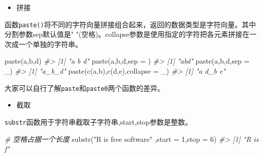 \documentclass[
]{book}
\newenvironment{Shaded}{\begin{snugshade}}{\end{snugshade}}
\newcommand{\AttributeTok}[1]{\textcolor[rgb]{0.77,0.63,0.00}{#1}}
\newcommand{\CommentTok}[1]{\textcolor[rgb]{0.56,0.35,0.01}{\textit{#1}}}
\newcommand{\DecValTok}[1]{\textcolor[rgb]{0.00,0.00,0.81}{#1}}
\newcommand{\FunctionTok}[1]{\textcolor[rgb]{0.00,0.00,0.00}{#1}}
\newcommand{\NormalTok}[1]{#1}
\newcommand{\StringTok}[1]{\textcolor[rgb]{0.31,0.60,0.02}{#1}}
\providecommand{\tightlist}{%
  \setlength{\itemsep}{0pt}\setlength{\parskip}{0pt}}
\begin{document}
\begin{itemize}
\tightlist
\item
  拼接
\end{itemize}

函数\texttt{paste()}将不同的字符向量拼接组合起来，返回的数据类型是字符向量。其中分割参数sep默认值是" "(空格)。collapse参数是使用指定的字符把各元素拼接在一次成一个单独的字符串。

\begin{Shaded}
\begin{Highlighting}[]
\FunctionTok{paste}\NormalTok{(}\StringTok{\textquotesingle{}a\textquotesingle{}}\NormalTok{,}\StringTok{\textquotesingle{}b\textquotesingle{}}\NormalTok{,}\StringTok{\textquotesingle{}d\textquotesingle{}}\NormalTok{)}
\CommentTok{\#\textgreater{} [1] "a b d"}
\FunctionTok{paste}\NormalTok{(}\StringTok{\textquotesingle{}a\textquotesingle{}}\NormalTok{,}\StringTok{\textquotesingle{}b\textquotesingle{}}\NormalTok{,}\StringTok{\textquotesingle{}d\textquotesingle{}}\NormalTok{,}\AttributeTok{sep =} \StringTok{\textquotesingle{}\textquotesingle{}}\NormalTok{)}
\CommentTok{\#\textgreater{} [1] "abd"}
\FunctionTok{paste}\NormalTok{(}\StringTok{\textquotesingle{}a\textquotesingle{}}\NormalTok{,}\StringTok{\textquotesingle{}b\textquotesingle{}}\NormalTok{,}\StringTok{\textquotesingle{}d\textquotesingle{}}\NormalTok{,}\AttributeTok{sep =} \StringTok{\textquotesingle{}\_\textquotesingle{}}\NormalTok{)}
\CommentTok{\#\textgreater{} [1] "a\_b\_d"}
\FunctionTok{paste}\NormalTok{(}\FunctionTok{c}\NormalTok{(}\StringTok{\textquotesingle{}a\textquotesingle{}}\NormalTok{,}\StringTok{\textquotesingle{}b\textquotesingle{}}\NormalTok{),}\FunctionTok{c}\NormalTok{(}\StringTok{\textquotesingle{}d\textquotesingle{}}\NormalTok{,}\StringTok{\textquotesingle{}e\textquotesingle{}}\NormalTok{),}\AttributeTok{collapse =} \StringTok{\textquotesingle{}\_\textquotesingle{}}\NormalTok{)}
\CommentTok{\#\textgreater{} [1] "a d\_b e"}
\end{Highlighting}
\end{Shaded}

大家可以自行了解\texttt{paste}和\texttt{paste0}两个函数的差异。

\begin{itemize}
\tightlist
\item
  截取
\end{itemize}

\texttt{substr}函数用于字符串截取子字符串,start,stop参数是整数。

\begin{Shaded}
\begin{Highlighting}[]
\CommentTok{\# 空格占据一个长度}
\FunctionTok{substr}\NormalTok{(}\StringTok{"R is free software"}\NormalTok{ ,}\AttributeTok{start =} \DecValTok{1}\NormalTok{,}\AttributeTok{stop =} \DecValTok{6}\NormalTok{)}
\CommentTok{\#\textgreater{} [1] "R is f"}
\end{Highlighting}
\end{Shaded}
\end{document}
